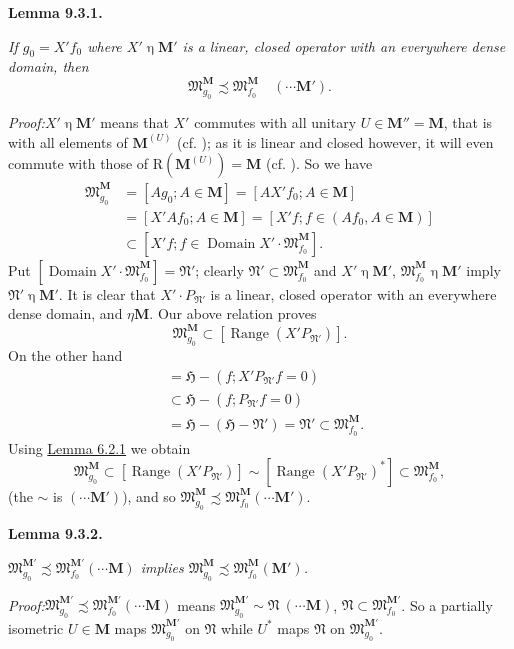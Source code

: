 \documentclass[12pt,b5paper,twoside]{article}
\newcommand{\Hspace}{\mathfrak H}
\newcommand{\M}{\mathbf M}
\newcommand{\Lemma}[1]{%
  \par\smallskip\noindent\phantomsection\label{lem:#1}\textbf{Lemma #1.}\enspace
}
\newcommand{\Proof}{\par\noindent\textit{Proof:}\enspace}
\newcommand{\lemref}[1]{\hyperref[lem:#1]{Lemma #1}}
\begin{document}
\Lemma{9.3.1}
{\itshape
If $g_0=X'f_0$ where $X'\mathbin\eta\M'$ is a linear, closed operator with
an everywhere dense domain, then
\[
 \mathfrak M_{g_0}^{\M}\precsim\mathfrak M_{f_0}^{\M}
 \quad(\cdots\M').
\]}

\Proof $X'\mathbin\eta\M'$ means that $X'$ commutes with all unitary
$U\in\M''=\M$, that is with all elements of $\M^{(U)}$ (cf.
\cite[p.~392]{ref18}); as it is linear and closed however, it will even
commute with those of $\mathrm R(\M^{(U)})=\M$ (cf.
\cite[pp.~392, 405]{ref18}). So we have
\begin{align*}
 \mathfrak M_{g_0}^{\M}
 &=[Ag_0;A\in\M]=[AX'f_0;A\in\M]\\
 &=[X'Af_0;A\in\M]=[X'f;f\in(Af_0,A\in\M)]\\
 &\subset[X'f;f\in\operatorname{Domain}X'\cdot
              \mathfrak M_{f_0}^{\M}].
\end{align*}
Put
$[\operatorname{Domain}X'\cdot\mathfrak M_{f_0}^{\M}]=\mathfrak N'$;
clearly $\mathfrak N'\subset\mathfrak M_{f_0}^{\M}$ and
$X'\mathbin\eta\M'$, $\mathfrak M_{f_0}^{\M}\mathbin\eta\M'$ imply
$\mathfrak N'\mathbin\eta\M'$. It is clear that
$X'\cdot P_{\mathfrak N'}$ is a linear, closed operator with an everywhere
dense domain, and $\mathbin\eta\M$. Our above relation proves
\[
 \mathfrak M_{g_0}^{\M}\subset
 [\operatorname{Range}(X'P_{\mathfrak N'})].
\]
On the other hand
\begin{align*}
 [\operatorname{Range}(X'P_{\mathfrak N'})^*]
 &=\Hspace-(f;X'P_{\mathfrak N'}f=0)\\
 &\subset\Hspace-(f;P_{\mathfrak N'}f=0)\\
 &=\Hspace-(\Hspace-\mathfrak N')=\mathfrak N'
 \subset\mathfrak M_{f_0}^{\M}.
\end{align*}
Using \lemref{6.2.1} we obtain
\[
 \mathfrak M_{g_0}^{\M}\subset
 [\operatorname{Range}(X'P_{\mathfrak N'})]
 \sim[\operatorname{Range}(X'P_{\mathfrak N'})^*]
 \subset\mathfrak M_{f_0}^{\M},
\]
(the $\sim$ is $(\cdots\M')$), and so
$\mathfrak M_{g_0}^{\M}\precsim\mathfrak M_{f_0}^{\M}
(\cdots\M')$.

\Lemma{9.3.2}
{\itshape
$\mathfrak M_{g_0}^{\M'}\precsim\mathfrak M_{f_0}^{\M'}
(\cdots\M)$ implies
$\mathfrak M_{g_0}^{\M}\precsim\mathfrak M_{f_0}^{\M}
(\M')$.}

\Proof $\mathfrak M_{g_0}^{\M'}\precsim\mathfrak M_{f_0}^{\M'}
(\cdots\M)$ means
$\mathfrak M_{g_0}^{\M'}\sim\mathfrak N\ (\cdots\M)$,
$\mathfrak N\subset\mathfrak M_{f_0}^{\M'}$. So a partially isometric
$U\in\M$ maps $\mathfrak M_{g_0}^{\M'}$ on $\mathfrak N$ while $U^*$ maps
$\mathfrak N$ on $\mathfrak M_{g_0}^{\M'}$.
\end{document}
